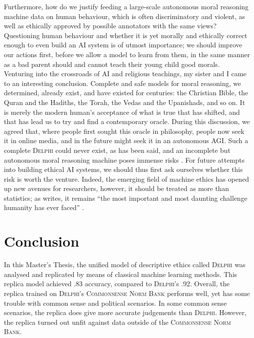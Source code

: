 \documentclass[final]{clv3} %
\begin{document}
Furthermore, how do we justify feeding a large-scale autonomous moral reasoning machine data on human behaviour, which is often discriminatory and violent, as well as ethically approved by possible annotators with the same views? Questioning human behaviour and whether it is yet morally and ethically correct enough to even build an AI system is of utmost importance; we should improve our actions first, before we allow a model to learn from them, in the same manner as a bad parent should and cannot teach their young child good morals.\\

Venturing into the crossroads of AI and religious teachings, my sister and I came to an interesting conclusion. Complete and safe models for moral reasoning, we determined, already exist, and have existed for centuries: the Christian Bible, the Quran and the Hadiths, the Torah, the Vedas and the Upanishads, and so on. It is merely the modern human’s acceptance of what is true that has shifted, and that has lead us to try and find a contemporary oracle. During this discussion, we agreed that, where people first sought this oracle in philosophy, people now seek it in online media, and in the future might seek it in an autonomous AGI. Such a complete \textsc{Delphi} could never exist, as has been said, and an incomplete but autonomous moral reasoning machine poses immense risks \cite{tegmark}. For future attempts into building ethical AI systems, we should thus first ask ourselves whether this risk is worth the venture. Indeed, the emerging field of machine ethics has opened up new avenues for researchers, however, it should be treated as more than statistics; as \citet{bostrom} writes, it remains “the most important and most daunting challenge humanity has ever faced” \cite[vii]{bostrom}.\\
\newpage

\section{Conclusion}

In this Master’s Thesis, the unified model of descriptive ethics called \textsc{Delphi} was analysed and replicated by means of classical machine learning methods. This replica model achieved .83 accuracy, compared to \textsc{Delphi}’s .92. Overall, the replica trained on \textsc{Delphi}’s \textsc{Commonsense Norm Bank} performs well, yet has some trouble with common sense and political scenarios. In some common sense scenarios, the replica does give more accurate judgements than \textsc{Delphi}. However, the replica turned out unfit against data outside of the \textsc{Commonsense Norm Bank}.
\end{document}
